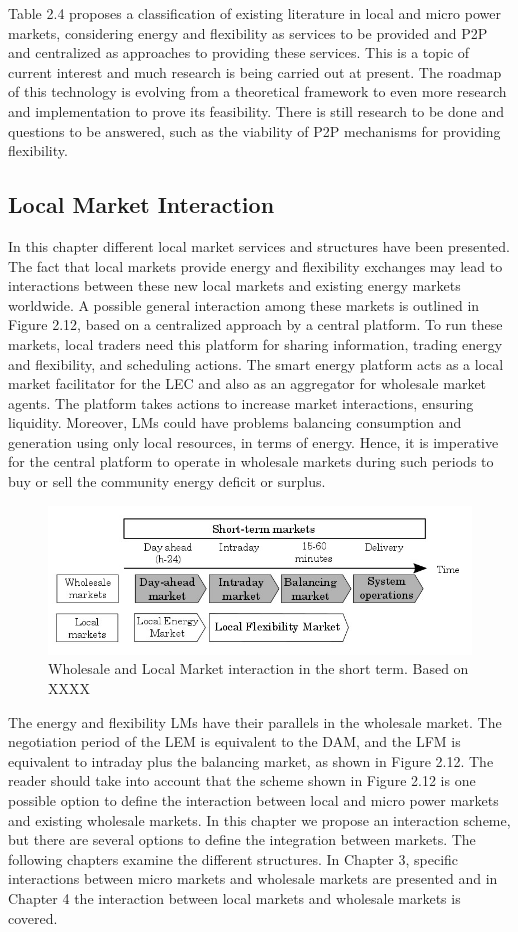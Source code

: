 Table 2.4 proposes a classification of existing literature in local and micro power markets, considering energy and flexibility as services to be provided and P2P and centralized as approaches to providing these services. This is a topic of current interest and much research is being carried out at present. The roadmap of this technology is evolving from a theoretical framework to even more research and implementation to prove its feasibility. There is still research to be done and questions to be answered, such as the viability of P2P mechanisms for providing flexibility.

\subsection{Local Market Interaction}
In this chapter different local market services and structures have been presented. The fact that local markets provide energy and flexibility exchanges may lead to interactions between these new local markets and existing energy markets worldwide. A possible general interaction among these markets is outlined in Figure 2.12, based on a centralized approach by a central platform. To run these markets, local traders need this platform for sharing information, trading energy and flexibility, and scheduling actions. The smart energy platform acts as a local market facilitator for the LEC and also as an aggregator for wholesale market agents. The platform takes actions to increase market interactions, ensuring liquidity. Moreover, LMs could have problems balancing consumption and generation using only local resources, in terms of energy. Hence, it is imperative for the central platform to operate in wholesale markets during such periods to buy or sell the community energy deficit or surplus.

\begin{figure}[]
	\centering
	\includegraphics[width=0.4\columnwidth ]{ChapterIntro/Figures/LM_WSM_Interaction.jpg}
		\caption{Wholesale and Local Market interaction in the short term. Based on XXXX}  
\end{figure}


The energy and flexibility LMs have their parallels in the wholesale market. The negotiation period of the LEM is equivalent to the DAM, and the LFM is equivalent to intraday plus the balancing market, as shown in Figure 2.12. The reader should take into account that the scheme shown in Figure 2.12 is one possible option to define the interaction between local and micro power markets and existing wholesale markets. In this chapter we propose an interaction scheme, but there are several options to define the integration between markets. The following chapters examine the different structures. In Chapter 3, specific interactions between micro markets
and wholesale markets are presented and in Chapter 4 the interaction between local markets and wholesale
markets is covered.

